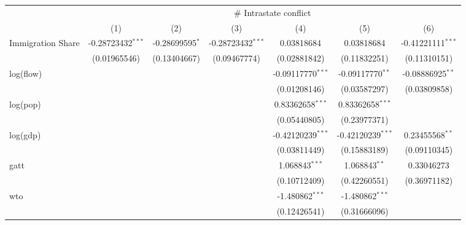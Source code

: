
\begingroup
\centering
\begin{tabular}{lcccccc}
   \toprule
    & \multicolumn{6}{c}{\# Intrastate conflict}\\
                     & (1)                 & (2)               & (3)                 & (4)                 & (5)                 & (6)\\  
   \midrule 
   Immigration Share & -0.28723432$^{***}$ & -0.28699595$^{*}$ & -0.28723432$^{***}$ & 0.03818684          & 0.03818684          & -0.41221111$^{***}$\\   
                     & (0.01965546)        & (0.13404667)      & (0.09467774)        & (0.02881842)        & (0.11832251)        & (0.11310151)\\   
   log(flow)         &                     &                   &                     & -0.09117770$^{***}$ & -0.09117770$^{**}$  & -0.08886925$^{**}$\\   
                     &                     &                   &                     & (0.01208146)        & (0.03587297)        & (0.03809858)\\   
   log(pop)          &                     &                   &                     & 0.83362658$^{***}$  & 0.83362658$^{***}$  &   \\   
                     &                     &                   &                     & (0.05440805)        & (0.23977371)        &   \\   
   log(gdp)          &                     &                   &                     & -0.42120239$^{***}$ & -0.42120239$^{***}$ & 0.23455568$^{**}$\\   
                     &                     &                   &                     & (0.03811449)        & (0.15883189)        & (0.09110345)\\   
   gatt              &                     &                   &                     & 1.068843$^{***}$    & 1.068843$^{**}$     & 0.33046273\\   
                     &                     &                   &                     & (0.10712409)        & (0.42260551)        & (0.36971182)\\   
   wto               &                     &                   &                     & -1.480862$^{***}$   & -1.480862$^{***}$   &   \\   
                     &                     &                   &                     & (0.12426541)        & (0.31666096)        &   \\   

\end{tabular}
